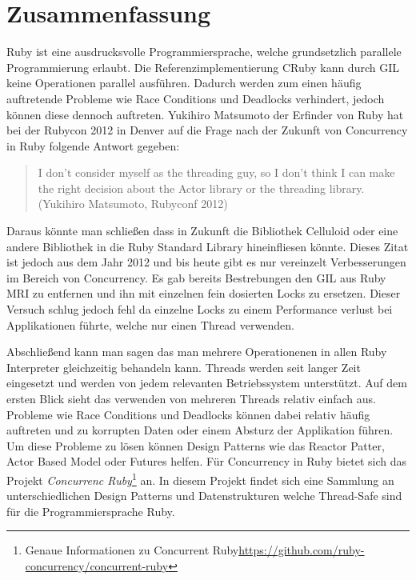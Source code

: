 \section{Zusammenfassung}
Ruby ist eine ausdrucksvolle Programmiersprache, welche grundsetzlich parallele Programmierung erlaubt. Die Referenzimplementierung CRuby kann durch GIL keine Operationen parallel ausführen. Dadurch werden zum einen häufig auftretende Probleme wie Race Conditions und Deadlocks verhindert, jedoch können diese dennoch auftreten. Yukihiro Matsumoto der Erfinder von Ruby hat bei der Rubycon 2012 in Denver auf die Frage nach der Zukunft von Concurrency in Ruby folgende Antwort gegeben:

\begin{quote}
I don't consider myself as the threading guy, so I don't think I can make the right decision about the Actor library or the threading library.
 (Yukihiro Matsumoto, Rubyconf 2012)
\end{quote}

Daraus könnte man schließen dass in Zukunft die Bibliothek Celluloid oder eine andere Bibliothek in die Ruby Standard Library hineinfliesen könnte. Dieses Zitat ist jedoch aus dem Jahr 2012 und bis heute gibt es nur vereinzelt Verbesserungen im Bereich von Concurrency. Es gab bereits Bestrebungen den GIL aus Ruby MRI zu entfernen und ihn mit einzelnen fein dosierten Locks zu ersetzen. Dieser Versuch schlug jedoch fehl da einzelne Locks zu einem Performance verlust bei Applikationen führte, welche nur einen Thread verwenden. 

Abschließend kann man sagen das man mehrere Operationenen in allen Ruby Interpreter gleichzeitig behandeln kann. Threads werden seit langer Zeit eingesetzt und werden von jedem relevanten Betriebssystem unterstützt. Auf dem ersten Blick sieht das verwenden von mehreren Threads relativ einfach aus. Probleme wie Race Conditions und Deadlocks können dabei relativ häufig auftreten und zu korrupten Daten oder einem Absturz der Applikation führen. Um diese Probleme zu lösen können Design Patterns wie das Reactor Patter, Actor Based Model oder Futures helfen. Für Concurrency in Ruby bietet sich das Projekt \emph{Concurrenc Ruby}\footnote{Genaue Informationen zu Concurrent Ruby\url{https://github.com/ruby-concurrency/concurrent-ruby}} an. In diesem Projekt findet sich eine Sammlung an unterschiedlichen Design Patterns und Datenstrukturen welche Thread-Safe sind für die Programmiersprache Ruby.

